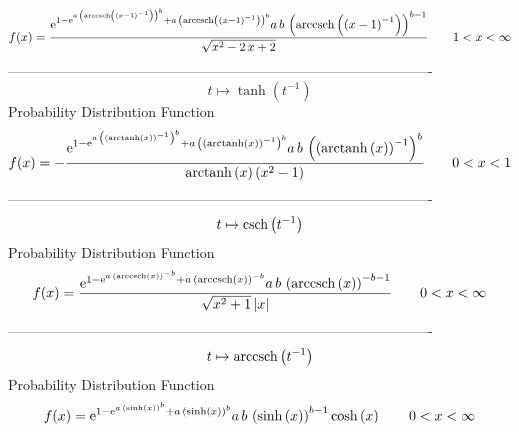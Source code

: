 \documentclass[12pt]{article}
\begin{document}
$$  f(x)={\frac {{{\rm e}^{1-{{\rm e}^{a\, \left( {\rm arccsch} \left( \left( x
-1 \right) ^{-1}\right) \right) ^{b}}}+a\, \left( {\rm arccsch} \left(
 \left( x-1 \right) ^{-1}\right) \right) ^{b}}}a\,b\, \left( 
{\rm arccsch} \left( \left( x-1 \right) ^{-1}\right) \right) ^{b-1}}{
\sqrt {{x}^{2}-2\,x+2}}}
 \qquad1
 < x < \infty 
$$-------------------------------------------------------------------------------------------  \\$$t\mapsto \tanh \left( {t}^{-1} \right) 
$$Probability Distribution Function 
$$  f(x)=-{\frac {{{\rm e}^{1-{{\rm e}^{a\, \left(  \left( {\rm arctanh} \left(
x\right) \right) ^{-1} \right) ^{b}}}+a\, \left(  \left( {\rm arctanh}
 \left(x\right) \right) ^{-1} \right) ^{b}}}a\,b\, \left(  \left( 
{\rm arctanh} \left(x\right) \right) ^{-1} \right) ^{b}}{{\rm arctanh}
 \left(x\right) \left( {x}^{2}-1 \right) }}
 \qquad0
 < x < 1
$$-------------------------------------------------------------------------------------------  \\$$t\mapsto {\rm csch} \left({t}^{-1}\right)
$$Probability Distribution Function 
$$  f(x)={\frac {{{\rm e}^{1-{{\rm e}^{a\, \left( {\rm arccsch} \left(x\right)
 \right) ^{-b}}}+a\, \left( {\rm arccsch} \left(x\right) \right) ^{-b}
}}a\,b\, \left( {\rm arccsch} \left(x\right) \right) ^{-b-1}}{\sqrt {{
x}^{2}+1} \left| x \right| }}
 \qquad0
 < x < \infty 
$$-------------------------------------------------------------------------------------------  \\$$t\mapsto {\rm arccsch} \left({t}^{-1}\right)
$$Probability Distribution Function 
$$  f(x)={{\rm e}^{1-{{\rm e}^{a\, \left( \sinh \left( x \right)  \right) ^{b}}
}+a\, \left( \sinh \left( x \right)  \right) ^{b}}}a\,b\, \left( \sinh
 \left( x \right)  \right) ^{b-1}\cosh \left( x \right) 
 \qquad0
 < x < \infty 
$$
\end{document}

